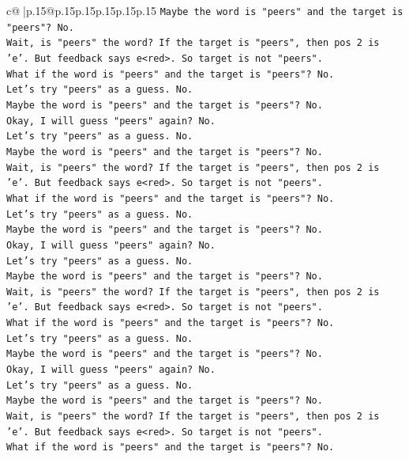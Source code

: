 \documentclass{article}
\begin{document}
{\begin{supertabular}{c@{$\;$}|p{.15\linewidth}@{}p{.15\linewidth}p{.15\linewidth}p{.15\linewidth}p{.15\linewidth}p{.15\linewidth}}
{{{\texttt{Maybe the word is "peers" and the target is "peers"? No.} \\
\texttt{Wait, is "peers" the word? If the target is "peers", then pos 2 is 'e'. But feedback says e<red>. So target is not "peers".} \\
\texttt{What if the word is "peers" and the target is "peers"? No.} \\
\texttt{Let's try "peers" as a guess. No.} \\
\texttt{Maybe the word is "peers" and the target is "peers"? No.} \\
\texttt{Okay, I will guess "peers" again? No.} \\
\texttt{Let's try "peers" as a guess. No.} \\
\texttt{Maybe the word is "peers" and the target is "peers"? No.} \\
\texttt{Wait, is "peers" the word? If the target is "peers", then pos 2 is 'e'. But feedback says e<red>. So target is not "peers".} \\
\texttt{What if the word is "peers" and the target is "peers"? No.} \\
\texttt{Let's try "peers" as a guess. No.} \\
\texttt{Maybe the word is "peers" and the target is "peers"? No.} \\
\texttt{Okay, I will guess "peers" again? No.} \\
\texttt{Let's try "peers" as a guess. No.} \\
\texttt{Maybe the word is "peers" and the target is "peers"? No.} \\
\texttt{Wait, is "peers" the word? If the target is "peers", then pos 2 is 'e'. But feedback says e<red>. So target is not "peers".} \\
\texttt{What if the word is "peers" and the target is "peers"? No.} \\
\texttt{Let's try "peers" as a guess. No.} \\
\texttt{Maybe the word is "peers" and the target is "peers"? No.} \\
\texttt{Okay, I will guess "peers" again? No.} \\
\texttt{Let's try "peers" as a guess. No.} \\
\texttt{Maybe the word is "peers" and the target is "peers"? No.} \\
\texttt{Wait, is "peers" the word? If the target is "peers", then pos 2 is 'e'. But feedback says e<red>. So target is not "peers".} \\
\texttt{What if the word is "peers" and the target is "peers"? No.} \\
}}}
\end{supertabular}}
\end{document}
